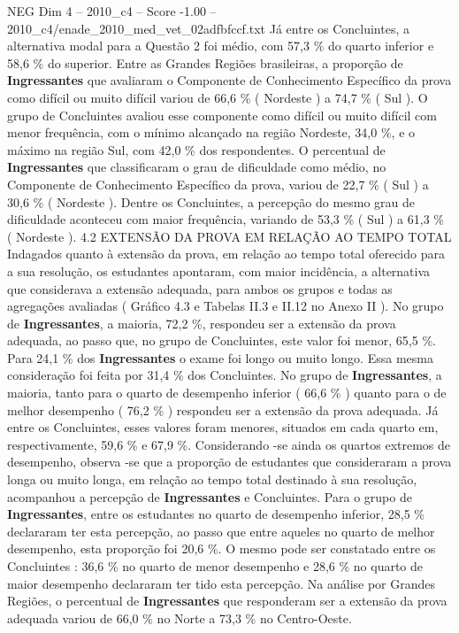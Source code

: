 \begin{textsample}{NEG Dim 4 – 2010\_c4 – Score -1.00 – 2010\_c4/enade\_2010\_med\_vet\_02adfbfccf.txt}
Já entre os Concluintes, a alternativa modal para a Questão 2 foi médio, com 57,3 \% do quarto inferior e 58,6 \% do superior.
Entre as Grandes Regiões brasileiras, a proporção de \textbf{Ingressantes} que avaliaram o Componente de Conhecimento Específico da prova como difícil ou muito difícil variou de 66,6 \% ( Nordeste ) a 74,7 \% ( Sul ).
O grupo de Concluintes avaliou esse componente como difícil ou muito difícil com menor frequência, com o mínimo alcançado na região Nordeste, 34,0 \%, e o máximo na região Sul, com 42,0 \% dos respondentes.
O percentual de \textbf{Ingressantes} que classificaram o grau de dificuldade como médio, no Componente de Conhecimento Específico da prova, variou de 22,7 \% ( Sul ) a 30,6 \% ( Nordeste ).
Dentre os Concluintes, a percepção do mesmo grau de dificuldade aconteceu com maior frequência, variando de 53,3 \% ( Sul ) a 61,3 \% ( Nordeste ). 4.2 EXTENSÃO DA PROVA EM RELAÇÃO AO TEMPO TOTAL Indagados quanto à extensão da prova, em relação ao tempo total oferecido para a sua resolução, os estudantes apontaram, com maior incidência, a alternativa que considerava a extensão adequada, para ambos os grupos e todas as agregações avaliadas ( Gráfico 4.3 e Tabelas II.3 e II.12 no Anexo II ).
No grupo de \textbf{Ingressantes}, a maioria, 72,2 \%, respondeu ser a extensão da prova adequada, ao passo que, no grupo de Concluintes, este valor foi menor, 65,5 \%.
Para 24,1 \% dos \textbf{Ingressantes} o exame foi longo ou muito longo.
Essa mesma consideração foi feita por 31,4 \% dos Concluintes.
No grupo de \textbf{Ingressantes}, a maioria, tanto para o quarto de desempenho inferior ( 66,6 \% ) quanto para o de melhor desempenho ( 76,2 \% ) respondeu ser a extensão da prova adequada.
Já entre os Concluintes, esses valores foram menores, situados em cada quarto em, respectivamente, 59,6 \% e 67,9 \%.
Considerando -se ainda os quartos extremos de desempenho, observa -se que a proporção de estudantes que consideraram a prova longa ou muito longa, em relação ao tempo total destinado à sua resolução, acompanhou a percepção de \textbf{Ingressantes} e Concluintes.
Para o grupo de \textbf{Ingressantes}, entre os estudantes no quarto de desempenho inferior, 28,5 \% declararam ter esta percepção, ao passo que entre aqueles no quarto de melhor desempenho, esta proporção foi 20,6 \%.
O mesmo pode ser constatado entre os Concluintes : 36,6 \% no quarto de menor desempenho e 28,6 \% no quarto de maior desempenho declararam ter tido esta percepção.
Na análise por Grandes Regiões, o percentual de \textbf{Ingressantes} que responderam ser a extensão da prova adequada variou de 66,0 \% no Norte a 73,3 \% no Centro-Oeste.

\end{textsample}
